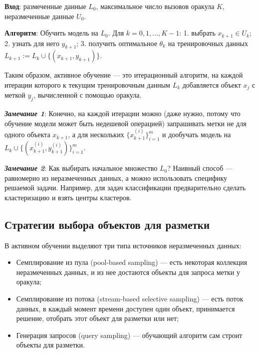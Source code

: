 \documentclass[]{article}
\begin{document}
\textbf{Вход}: размеченные данные \(L_0\), максимальное число вызовов
оракула \(K\), неразмеченные данные \(U_0\).

\textbf{Алгоритм}: Обучить модель на \(L_0\). Для
\(k = 0, 1, \ldots, K - 1\): 1. выбрать \(x_{k + 1} \in U_k\); 2. узнать
для него \(y_{k + 1}\); 3. получить оптимальное \(\theta_k\) на
тренировочных данных
\(L_{k + 1} := L_{k} \cup \{(x_{k + 1}, y_{k + 1})\}\).

Таким образом, активное обучение --- это итерационный алгоритм, на
каждой итерации которого к текущим тренировочным данным \(L_{k}\)
добавляется объект \(x_j\) с меткой \(y_j\), вычисленной с помощью
оракула.

\emph{\textbf{Замечание 1}}: Конечно, на каждой итерации можно (даже
нужно, потому что обучение модели может быть недешевой операцией)
запрашивать метки не для одного объекта \(x_{k + 1}\), а для нескольких
\(\{x_{k + 1}^{(i)}\}_{i = 1}^{m}\) и дообучать модель на
\(L_{k} \cup \{(x_{k + 1}^{(i)}, y_{k + 1}^{(i)})\}_{i = 1}^{m}\).

\emph{\textbf{Замечание 2}}: Как выбирать начальное множество \(L_0\)?
Наивный способ --- равномерно из неразмеченных данных, а можно
использовать специфику решаемой задачи. Например, для задач
классификации предварительно сделать кластеризацию и взять центры
кластеров.

\subsection{Стратегии выбора объектов для
разметки}\label{ux441ux442ux440ux430ux442ux435ux433ux438ux438-ux432ux44bux431ux43eux440ux430-ux43eux431ux44aux435ux43aux442ux43eux432-ux434ux43bux44f-ux440ux430ux437ux43cux435ux442ux43aux438}

В активном обучении выделяют три типа источников неразмеченных данных:

\begin{itemize}
\item
  Семплирование из пула (pool-based sampling) --- есть некоторая
  коллекция неразмеченных данных, и из нее достаются объекты для запроса
  метки у оракула;
\item
  Семплирование из потока (stream-based selective sampling) --- есть
  поток данных, в каждый момент времени доступен один объект,
  принимается решение, отобрать этот объект для разметки или нет;
\item
  Генерация запросов (query sampling) --- обучающий алгоритм сам строит
  объекты для разметки.
\end{itemize}
\end{document}
